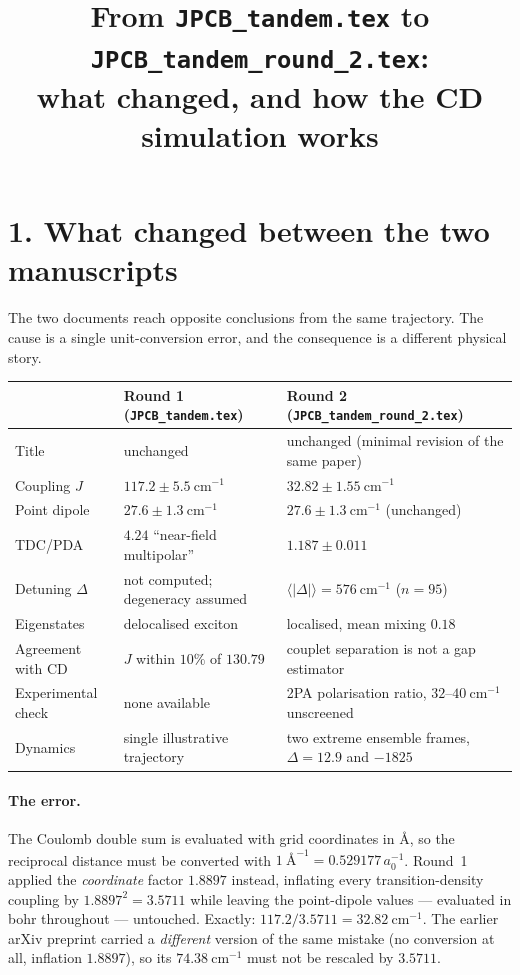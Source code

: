 \documentclass[11pt,a4paper]{article}
\title{\vspace{-1.6cm}\textbf{From \texttt{JPCB\_tandem.tex} to
\texttt{JPCB\_tandem\_round\_2.tex}:\\ what changed, and how the CD simulation works}}
\author{}
\date{\vspace{-1.2cm}}
\begin{document}
\maketitle
\vspace{-1.0cm}

\section*{1. What changed between the two manuscripts}

The two documents reach opposite conclusions from the same trajectory. The cause
is a single unit-conversion error, and the consequence is a different physical
story.

\begin{table}[h]
\centering\small
\begin{tabular}{lll}
\toprule
& \textbf{Round 1} (\texttt{JPCB\_tandem.tex}) & \textbf{Round 2} (\texttt{JPCB\_tandem\_round\_2.tex}) \\
\midrule
Title & unchanged & unchanged (minimal revision of the same paper) \\
Coupling $J$ & $117.2 \pm 5.5~\mathrm{cm^{-1}}$ & $\bm{32.82 \pm 1.55~\mathrm{cm^{-1}}}$ \\
Point dipole & $27.6 \pm 1.3~\mathrm{cm^{-1}}$ & $27.6 \pm 1.3~\mathrm{cm^{-1}}$ (unchanged) \\
TDC/PDA & $4.24$ ``near-field multipolar'' & $\bm{1.187 \pm 0.011}$ \\
Detuning $\Delta$ & not computed; degeneracy assumed & $\langle|\Delta|\rangle = 576~\mathrm{cm^{-1}}$ ($n=95$) \\
Eigenstates & delocalised exciton & localised, mean mixing $0.18$ \\
Agreement with CD & $J$ within $10\%$ of $130.79$ & couplet separation is not a gap estimator \\
Experimental check & none available & 2PA polarisation ratio, $32$--$40~\mathrm{cm^{-1}}$ unscreened \\
Dynamics & single illustrative trajectory & two extreme ensemble frames, $\Delta = 12.9$ and $-1825$ \\
\bottomrule
\end{tabular}
\end{table}

\paragraph{The error.} The Coulomb double sum is evaluated with grid
coordinates in \AA{}, so the reciprocal distance must be converted with
$1~\text{\AA}^{-1} = 0.529177\,a_0^{-1}$. Round~1 applied the \emph{coordinate}
factor $1.8897$ instead, inflating every transition-density coupling by
$1.8897^{2} = 3.5711$ while leaving the point-dipole values --- evaluated in
bohr throughout --- untouched. Exactly:
$117.2/3.5711 = 32.82~\mathrm{cm^{-1}}$. The earlier arXiv preprint carried a
\emph{different} version of the same mistake (no conversion at all, inflation
$1.8897$), so its $74.38~\mathrm{cm^{-1}}$ must not be rescaled by $3.5711$.
\end{document}
